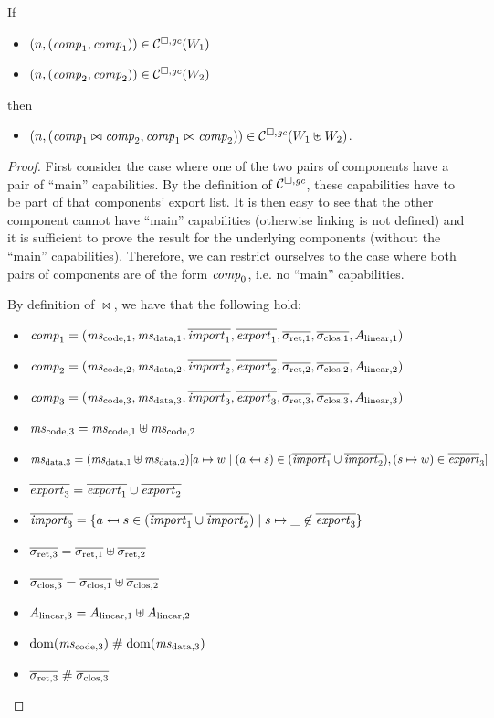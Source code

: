 \documentclass[a4paper]{article}
\begin{document}
\begin{lemma}
  \label{lem:compat-linking}
  If
  \begin{itemize}
  \item $\left(n,(\mathit{comp}_1,\mathit{comp}_1)\right) \in \mathcal{C}^{\square,\mathit{gc}}(W_1)$
  \item $\left(n,(\mathit{comp}_2,\mathit{comp}_2)\right) \in \mathcal{C}^{\square,\mathit{gc}}(W_2)$
  \end{itemize}
  then
  \begin{itemize}
  \item $\left(n,(\mathit{comp}_1 \bowtie \mathit{comp}_2,\mathit{comp}_1\bowtie\mathit{comp}_2)\right) \in \mathcal{C}^{\square,\mathit{gc}}(W_1 \uplus W_2)$.
  \end{itemize}
\end{lemma}
\begin{proof}
  First consider the case where one of the two pairs of components have a pair of ``main'' capabilities.
  By the definition of $\mathcal{C}^{\square,\mathit{gc}}$, these capabilities have to be part of that components' export list.
  It is then easy to see that the other component cannot have ``main'' capabilities (otherwise linking is not defined) and it is sufficient to prove the result for the underlying components (without the ``main'' capabilities).
  Therefore, we can restrict ourselves to the case where both pairs of components are of the form $\mathit{comp}_0$, i.e. no ``main'' capabilities.

  By definition of $\bowtie$, we have that the following hold:
  \begin{itemize}
  \item $\var{comp}_1 = (\mscode[1], \msdata[1], \overline{\var{import}_1}, \overline{\var{export}_1}, \sigrets[1], \sigcloss[1],A_{\linear,1})$
  \item $\var{comp}_2 = (\mscode[2], \msdata[2], \overline{\var{import}_2}, \overline{\var{export}_2}, \sigrets[2], \sigcloss[2],A_{\linear,2})$
  \item $\var{comp}_3 = (\mscode[3], \msdata[3], \overline{\var{import}_3}, \overline{\var{export}_3}, \sigrets[3], \sigcloss[3],A_{\linear,3})$
  \item $\mscode[3] = \mscode[1] \uplus \mscode[2]$
  \item $\msdata[3] = (\msdata[1] \uplus \msdata[2])[a \mapsto w \mid (a \mapsfrom s) \in (\overline{\var{import}_1} \cup \overline{\var{import}_2}), (s \mapsto w) \in \overline{\var{export}}_3]$
  \item $\overline{\mathit{export}_3} = \overline{\mathit{export}_1} \cup \overline{\mathit{export}_2}$
  \item $\overline{\mathit{import}_3} = \{ a \mapsfrom s \in (\overline{\mathit{import}_1} \cup \overline{\mathit{import}_2}) \mid s \mapsto \_ \not\in \overline{\mathit{export}_3} \}$
  \item $\sigrets[3] = \sigrets[1] \uplus \sigrets[2]$
  \item $\sigcloss[3] = \sigcloss[1] \uplus \sigcloss[2]$
  \item $A_{\mathrm{linear},3} = A_{\mathrm{linear},1} \uplus A_{\mathrm{linear},2}$
  \item $\dom(\mscode[3]) \mathrel{\#} \dom(\msdata[3])$
  \item $\sigrets[3] \mathrel{\#} \sigcloss[3]$
  \end{itemize}


\end{proof}
\end{document}
